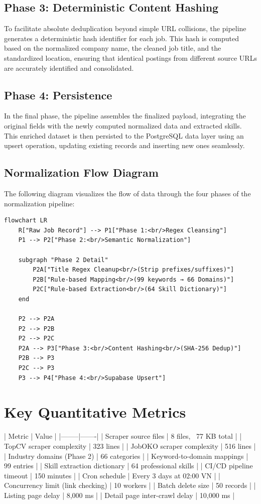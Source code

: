 \subsection{Phase 3: Deterministic Content Hashing}
To facilitate absolute deduplication beyond simple URL collisions, the pipeline generates a deterministic hash identifier for each job. This hash is computed based on the normalized company name, the cleaned job title, and the standardized location, ensuring that identical postings from different source URLs are accurately identified and consolidated.

\subsection{Phase 4: Persistence}
In the final phase, the pipeline assembles the finalized payload, integrating the original fields with the newly computed normalized data and extracted skills. This enriched dataset is then persisted to the PostgreSQL data layer using an upsert operation, updating existing records and inserting new ones seamlessly.

\subsection{Normalization Flow Diagram}
The following diagram visualizes the flow of data through the four phases of the normalization pipeline:

\begin{verbatim}
flowchart LR
    R["Raw Job Record"] --> P1["Phase 1:<br/>Regex Cleansing"]
    P1 --> P2["Phase 2:<br/>Semantic Normalization"]
    
    subgraph "Phase 2 Detail"
        P2A["Title Regex Cleanup<br/>(Strip prefixes/suffixes)"]
        P2B["Rule-based Mapping<br/>(99 keywords → 66 Domains)"]
        P2C["Rule-based Extraction<br/>(64 Skill Dictionary)"]
    end
    
    P2 --> P2A
    P2 --> P2B
    P2 --> P2C
    P2A --> P3["Phase 3:<br/>Content Hashing<br/>(SHA-256 Dedup)"]
    P2B --> P3
    P2C --> P3
    P3 --> P4["Phase 4:<br/>Supabase Upsert"]
\end{verbatim}

\section{Key Quantitative Metrics}

| Metric | Value |
|--------|-------|
| Scraper source files | 8 files, ~77 KB total |
| TopCV scraper complexity | 323 lines |
| JobOKO scraper complexity | 516 lines |
| Industry domains (Phase 2) | 66 categories |
| Keyword-to-domain mappings | 99 entries |
| Skill extraction dictionary | 64 professional skills |
| CI/CD pipeline timeout | 150 minutes |
| Cron schedule | Every 3 days at 02:00 VN |
| Concurrency limit (link checking) | 10 workers |
| Batch delete size | 50 records |
| Listing page delay | 8,000 ms |
| Detail page inter-crawl delay | 10,000 ms |
